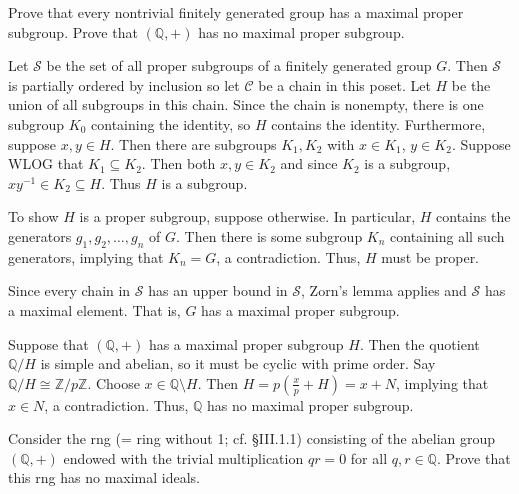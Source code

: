 \documentclass[../../master.tex]{subfiles}
\begin{document}
    \begin{problem}
        Prove that every nontrivial finitely generated group has a maximal
        proper subgroup. Prove that $(\mathbb{Q}, +)$ has no maximal proper
        subgroup.
    \end{problem}

    \begin{solution}
        Let $\mathscr{S}$ be the set of all proper subgroups of a finitely
        generated group $G$. Then $\mathscr{S}$ is partially ordered by
        inclusion so let $\mathscr{C}$ be a chain in this poset. Let $H$ be the
        union of all subgroups in this chain. Since the chain is nonempty, there
        is one subgroup $K_0$ containing the identity, so $H$ contains the
        identity. Furthermore, suppose $x, y \in H$. Then there are subgroups
        $K_1, K_2$ with $x \in K_1$, $y \in K_2$. Suppose WLOG that $K_1
        \subseteq K_2$. Then both $x, y \in K_2$ and since $K_2$ is a subgroup,
        $xy^{-1} \in K_2 \subseteq H$. Thus $H$ is a subgroup.

        To show $H$ is a proper subgroup, suppose otherwise. In particular, $H$
        contains the generators $g_1, g_2, \ldots, g_n$ of $G$. Then there is
        some subgroup $K_n$ containing all such generators, implying that $K_n =
        G$, a contradiction. Thus, $H$ must be proper.

        Since every chain in $\mathscr{S}$ has an upper bound in $\mathscr{S}$,
        Zorn's lemma applies and $\mathscr{S}$ has a maximal element. That is,
        $G$ has a maximal proper subgroup.

        Suppose that $(\mathbb{Q}, +)$ has a maximal proper subgroup $H$.
        Then the quotient $\mathbb{Q} / H$ is simple and abelian, so it must be
        cyclic with prime order. Say $\mathbb{Q} / H \cong \mathbb{Z} /
        p\mathbb{Z}$. Choose $x \in \mathbb{Q} \setminus H$. Then $H = p
        (\frac{x}{p} + H) = x + N$, implying that $x \in N$, a contradiction.
        Thus, $\mathbb{Q}$ has no maximal proper subgroup.
    \end{solution}

    \begin{problem}
        Consider the rng (= ring without 1; cf. \S III.1.1) consisting of the
        abelian group $(\mathbb{Q}, +)$ endowed with the trivial multiplication
        $qr = 0$ for all $q, r \in \mathbb{Q}$. Prove that this rng has no
        maximal ideals.
    \end{problem}
\end{document}
